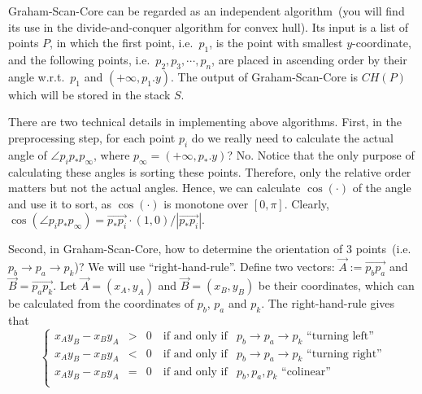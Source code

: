 Graham-Scan-Core can be regarded as an independent algorithm~(you will find its use
in the divide-and-conquer algorithm for convex hull). Its input
is a list of points $P$, in which the first point, i.e.\ $p_1$, is the point with smallest $y$-coordinate,
and the following points, i.e.\ $p_2, p_3, \cdots, p_n$, are placed in ascending order
by their angle w.r.t.\ $p_1$ and $(+\infty, p_1.y)$. The output of Graham-Scan-Core
is $CH(P)$ which will be stored in the stack $S$.

There are two technical details in implementing above algorithms.
First, in the preprocessing step, for each point $p_i$ do we really need to calculate the actual angle
of $\angle p_ip_*p_{\infty}$, where $p_{\infty} = (+\infty, p_*.y)$?
No. Notice that the only purpose of calculating these angles is sorting these points.
Therefore, only the relative order matters but not the actual angles.
Hence, we can calculate $\cos(\cdot)$ of the angle and use it to sort,
as $\cos(\cdot)$ is monotone over $[0,\pi]$. Clearly,
$\cos( \angle p_ip_*p_{\infty} ) = \overrightarrow{p_*p_i}\cdot (1, 0) / |\overrightarrow{p_*p_i}|$.

Second, in Graham-Scan-Core, how to determine
the orientation of 3 points~(i.e.\ $p_b \to p_a \to p_k$)? We will use ``right-hand-rule''.
Define two vectors: $\overrightarrow{A} := \overrightarrow{p_bp_a}$ and $\overrightarrow{B} = \overrightarrow{p_ap_k}$.
Let $\overrightarrow{A} = (x_A,y_A)$ and $\overrightarrow{B}= (x_B, y_B)$ be their coordinates,
which can be calculated from the coordinates of $p_b$, $p_a$ and $p_k$.
The right-hand-rule gives that
\begin{displaymath}
\left\{
	\begin{array}{rccl}
		x_Ay_B - x_By_A & > & 0 \quad \textrm{if and only if} & p_b \to p_a \to p_k \textrm{\ ``turning left''} \\
		x_Ay_B - x_By_A & < & 0 \quad \textrm{if and only if} & p_b \to p_a \to p_k \textrm{\ ``turning right''} \\
		x_Ay_B - x_By_A & = & 0 \quad \textrm{if and only if} & p_b, p_a, p_k \textrm{\ ``colinear''} \\
	\end{array}
\right.
\end{displaymath}

